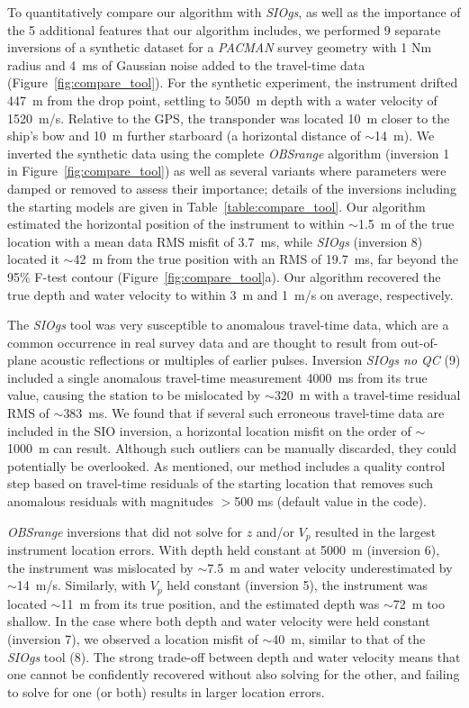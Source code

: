\documentclass[10pt,titlepage]{article}
\providecommand{\DIFaddtex}[1]{{\protect\color{blue}\uwave{#1}}} %
\providecommand{\DIFaddbegin}{} %
\providecommand{\DIFaddend}{} %
\providecommand{\DIFadd}[1]{\texorpdfstring{\DIFaddtex{#1}}{#1}} %
\begin{document}
To quantitatively compare our algorithm with \textit{SIOgs}, as well as the importance of the 5 additional features that our algorithm includes, we performed 9 separate inversions of a synthetic dataset for a \textit{PACMAN} survey geometry with 1 Nm radius and 4~ms of Gaussian noise added to the travel-time data (Figure~\ref{fig:compare_tool}). For the synthetic experiment, the instrument drifted 447~m from the drop point, settling to 5050~m depth with a water velocity of 1520~m/s. Relative to the GPS, the transponder was located 10~m closer to the ship's bow and 10~m further starboard (a horizontal distance of $\sim$14~m). We inverted the synthetic data using the complete \textit{OBSrange} algorithm (inversion 1 in Figure~\ref{fig:compare_tool}) as well as several variants where parameters were damped or removed to assess their importance; details of the inversions including the starting models are given in Table~\ref{table:compare_tool}. Our algorithm estimated the horizontal position of the instrument to within $\sim$1.5~m of the true location with a mean data RMS misfit of 3.7~ms, while \textit{SIOgs} (inversion 8) located it $\sim$42~m from the true position with an RMS of 19.7~ms, far beyond the 95\% F-test contour (Figure~\ref{fig:compare_tool}a). Our algorithm recovered the true depth and water velocity to within 3~m and 1~m/s on average, respectively.

The \textit{SIOgs} tool was very susceptible to anomalous travel-time data, which are a common occurrence in real survey data and are thought to result from out-of-plane acoustic reflections or multiples of earlier pulses. Inversion \textit{SIOgs no QC} (\DIFaddbegin \DIFadd{inversion }\DIFaddend 9) included a single anomalous travel-time measurement 4000~ms from its true value, causing the station to be mislocated by $\sim$320~m with a travel-time residual RMS of $\sim$383~ms. We found that if several such erroneous travel-time data are included in the SIO inversion, a horizontal location misfit on the order of $\sim$1000~m can result. Although such outliers can be manually discarded, they could potentially be overlooked. As mentioned, our method includes a quality control step based on travel-time residuals of the starting location that removes such anomalous residuals with magnitudes $>$500 ms (default value in the code).

\textit{OBSrange} inversions that did not solve for $z$ and/or $V_p$ resulted in the largest instrument location errors. With depth held constant at 5000~m (inversion 6), the instrument was mislocated by $\sim$7.5~m and water velocity underestimated by $\sim$14~m/s. Similarly, with $V_p$ held constant (inversion 5), the instrument was located $\sim$11~m from its true position, and the estimated depth was $\sim$72~m too shallow. In the case where both depth and water velocity were held constant (inversion 7), we observed a location misfit of $\sim$40~m, similar to that of the \textit{SIOgs} tool (\DIFaddbegin \DIFadd{inversion }\DIFaddend 8). The strong trade-off between depth and water velocity means that one cannot be confidently recovered without also solving for the other, and failing to solve for one (or both) results in larger location errors.
\end{document}
